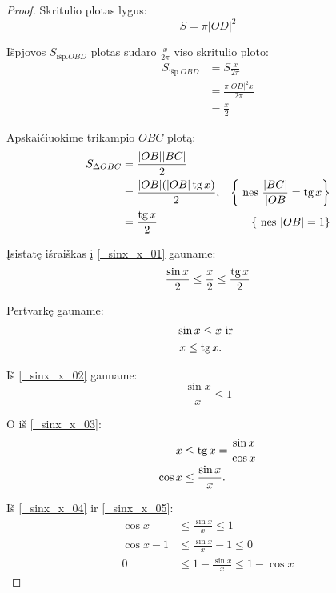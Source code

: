 \begin{exmp}
\begin{proof}
    Skritulio plotas lygus:
    \begin{equation*}
      S = \pi |OD|^2
    \end{equation*}

    Išpjovos $S_{\text{išp.}OBD}$ plotas sudaro $\frac{x}{2 \pi}$ viso 
    skritulio ploto:
    \begin{align*}
      S_{\text{išp.}OBD} &= S \frac{x}{2 \pi} \\
      &= \frac{\pi |OD|^2 x}{2 \pi} \\
      &= \frac{x}{2}
    \end{align*}

    Apskaičiuokime trikampio $OBC$ plotą:
    \begin{align*}
      S_{\Delta OBC} &= \frac{ |OB| |BC| }{2} \\
      &= \frac{ |OB| (|OB| \mathop{\text{tg}} x)}{2}, 
        &\left\{ \text{ nes } \frac{|BC|}{|OB} = \mathop{\text{tg}} x \right\} \\
      &= \frac{\mathop{\text{tg}} x}{2} &\left\{ \text{ nes } |OB| = 1 \right\}
    \end{align*}

    Įsistatę išraiškas į \ref{_sinx_x_01} gauname:
    \begin{equation*}
      \frac{\sin x}{2} \leq \frac{x}{2} \leq \frac{\mathop{\text{tg}} x}{2}
    \end{equation*}

    Pertvarkę gauname:
    \begin{align}
      \sin x \leq x & \text{ ir } \label{_sinx_x_02} \\
      x \leq \mathop{\text{tg}} x. \label{_sinx_x_03}
    \end{align}

    Iš \ref{_sinx_x_02} gauname:
    \begin{equation}
      \frac{\sin x}{x} \leq 1 
      \label{_sinx_x_04}
    \end{equation}

    O iš \ref{_sinx_x_03}:
    \begin{align}
      x & \leq \mathop{\text{tg}} x = \frac{\sin x}{\cos x} \\
      \cos x &\leq \frac{\sin x}{x}.
      \label{_sinx_x_05}
    \end{align}

    Iš \ref{_sinx_x_04} ir \ref{_sinx_x_05}:
    \begin{align}
      \cos x &\leq \frac{\sin x}{x} \leq 1 \\
      \cos x - 1 &\leq \frac{\sin x}{x} - 1 \leq 0 \\
      0 &\leq 1 - \frac{\sin x}{x} \leq 1 - \cos x
    \end{align}


\end{proof}
\end{exmp}
